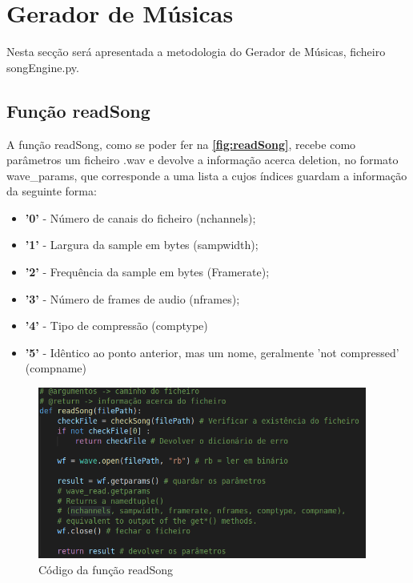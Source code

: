 \documentclass{report}
\begin{document}
\section{Gerador de Músicas}
\label{sec:songEngine}
Nesta secção será apresentada a metodologia do Gerador de Músicas, ficheiro songEngine.py.

\subsection{Função readSong}
\label{ssec:readSong}
A função readSong, como se poder fer na \textbf{\autoref{fig:readSong}}, recebe como parâmetros um ficheiro .wav e devolve a informação acerca deletion,
no formato wave\_params, que corresponde a uma lista a cujos índices guardam a informação da seguinte forma:
\begin{itemize}
    \item \textbf{'0'} - Número de canais do ficheiro (nchannels);
    \item \textbf{'1'} - Largura da sample em bytes (sampwidth);
    \item \textbf{'2'} - Frequência da sample em bytes (Framerate);
    \item \textbf{'3'} - Número de frames de audio (nframes);
    \item \textbf{'4'} - Tipo de compressão (comptype)
    \item \textbf{'5'} - Idêntico ao ponto anterior, mas um nome, geralmente 'not compressed' (compname)
\end{itemize}

\begin{figure}[!h]
\center 
\includegraphics[height=160pt]{img/readSong.png}
\caption{Código da função readSong}
\label{fig:readSong}
\end{figure}
\end{document}
